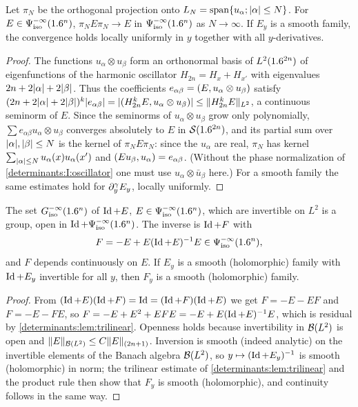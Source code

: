 \begin{lemma}\label{determinants:lem:approx}
  Let $\pi_N$ be the orthogonal projection onto
  $L_N=\operatorname{span}\{u_\alpha;\lvert \alpha\rvert\le N\}$. For
  $E\in\Psi^{-\infty}_{\mathrm{iso}}(1.6^n)$, $\pi_NE\pi_N\to E$ in $\Psi^{-\infty}_{\mathrm{iso}}(1.6^n)$
  as $N\to\infty$. If $E_y$ is a smooth family, the convergence holds locally
  uniformly in $y$ together with all $y$-derivatives.
\end{lemma}
\begin{proof}
  The functions $u_\alpha\otimes u_\beta$ form an orthonormal basis of
  $L^2(1.6^{2n})$ of eigenfunctions of the harmonic oscillator
  $H_{2n}=H_x+H_{x'}$ with eigenvalues $2n+2\lvert \alpha\rvert+2\lvert \beta\rvert$. Thus
  the coefficients $e_{\alpha\beta}=( E, u_\alpha\otimes u_\beta)$ satisfy
  $(2n+2\lvert \alpha\rvert+2\lvert \beta\rvert)^k\lvert e_{\alpha\beta}\rvert=\lvert ( H_{2n}^kE, u_\alpha\otimes u_\beta)\rvert\le\lVert H_{2n}^kE\rVert_{L^2}$,
  a continuous seminorm of $E$. Since the seminorms of $u_\alpha\otimes u_\beta$
  grow only polynomially, $\sum e_{\alpha\beta}u_\alpha\otimes u_\beta$
  converges absolutely to $E$ in $\mathcal{S}(1.6^{2n})$, and its partial sum over
  $\lvert \alpha\rvert,\lvert \beta\rvert\le N$ is the kernel of $\pi_NE\pi_N$: since the
  $u_\alpha$ are real, $\pi_N$ has kernel $\sum_{\lvert \alpha\rvert\le N}u_\alpha(x)u_\alpha(x')$
  and $( Eu_\beta, u_\alpha)=e_{\alpha\beta}$. (Without the phase
  normalization of \ref{determinants:I:oscillator} one must use
  $u_\alpha\otimes\bar u_\beta$ here.) For a smooth
  family the same estimates hold for $\partial_y^\gamma E_y$, locally uniformly.
\end{proof}

\begin{lemma}\label{determinants:lem:residual-inverse}
  The set $G^{-\infty}_{\mathrm{iso}}(1.6^n)$ of $\operatorname{Id}+E$, $E\in\Psi^{-\infty}_{\mathrm{iso}}(1.6^n)$,
  which are invertible on $L^2$ is a group, open in $\operatorname{Id}+\Psi^{-\infty}_{\mathrm{iso}}(1.6^n)$.
  The inverse is $\operatorname{Id}+F$ with
  \begin{equation}\label{determinants:eq:residual-inverse}
    F=-E+E(\operatorname{Id}+E)^{-1}E\in\Psi^{-\infty}_{\mathrm{iso}}(1.6^n),
  \end{equation}
  and $F$ depends continuously on $E$. If $E_y$ is a smooth (holomorphic)
  family with $\operatorname{Id}+E_y$ invertible for all $y$, then $F_y$ is a smooth
  (holomorphic) family.
\end{lemma}
\begin{proof}
  From $(\operatorname{Id}+E)(\operatorname{Id}+F)=\operatorname{Id}=(\operatorname{Id}+F)(\operatorname{Id}+E)$ we get $F=-E-EF$ and
  $F=-E-FE$, so $F=-E+E^2+EFE=-E+E(\operatorname{Id}+E)^{-1}E$, which is residual by
  \cref{determinants:lem:trilinear}. Openness holds because invertibility in
  $\mathcal{B}(L^2)$ is open and $\lVert E\rVert_{\mathcal{B}(L^2)}\le C\lVert E\rVert_{(2n+1)}$. Inversion
  is smooth (indeed analytic) on the invertible elements of the Banach algebra
  $\mathcal{B}(L^2)$, so $y\mapsto(\operatorname{Id}+E_y)^{-1}$ is smooth (holomorphic) in norm; the
  trilinear estimate of \cref{determinants:lem:trilinear} and the product rule
  then show that $F_y$ is smooth (holomorphic), and continuity follows in the
  same way.
\end{proof}

